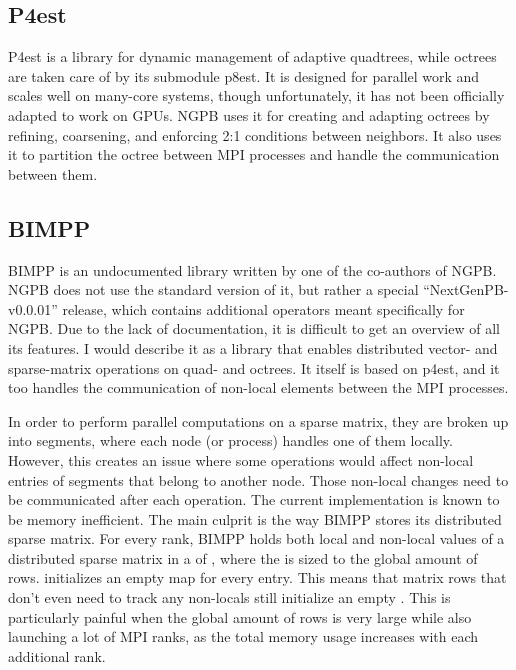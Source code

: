 \subsection{P4est}
\label{sec:nextgenpb-libraries-p4est}

P4est \cite{carsten_burstedde_2024_10839051} is a library for dynamic management of adaptive quadtrees, while octrees are taken care of by its submodule p8est.
It is designed for parallel work and scales well on many-core systems, though unfortunately, it has not been officially adapted to work on GPUs.
NGPB uses it for creating and adapting octrees by refining, coarsening, and enforcing 2:1 conditions between neighbors. It also uses it to partition the octree between MPI processes and handle the communication between them.

\subsection{BIMPP}
\label{sec:nextgenpb-libraries-bimpp}

BIMPP \cite{defalco_bimpp} is an undocumented library written by one of the co-authors of NGPB. 
NGPB does not use the standard version of it, but rather a special ``NextGenPB-v0.0.01'' release, which contains additional operators meant specifically for NGPB.
Due to the lack of documentation, it is difficult to get an overview of all its features.
I would describe it as a library that enables distributed vector- and sparse-matrix operations on quad- and octrees.
It itself is based on p4est, and it too handles the communication of non-local elements between the MPI processes.

In order to perform parallel computations on a sparse matrix, they are broken up into segments, where each node (or process) handles one of them locally.
However, this creates an issue where some operations would affect non-local entries of segments that belong to another node.
Those non-local changes need to be communicated after each operation.
The current implementation is known to be memory inefficient. 
The main culprit is the way BIMPP stores its distributed sparse matrix. 
For every rank, BIMPP holds both local and non-local values of a distributed sparse matrix in a  of , where the  is sized to the global amount of rows.
 initializes an empty map for every entry.
This means that matrix rows that don't even need to track any non-locals still initialize an empty .
This is particularly painful when the global amount of rows is very large while also launching a lot of MPI ranks, as the total memory usage increases with each additional rank.

